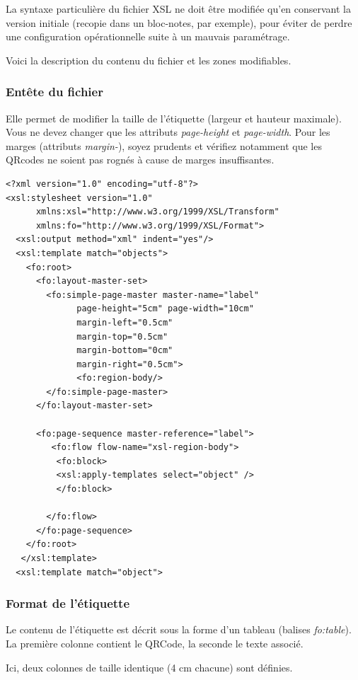 La syntaxe particulière du fichier XSL ne doit être modifiée qu'en conservant la version initiale (recopie dans un bloc-notes, par exemple), pour éviter de perdre une configuration opérationnelle suite à un mauvais paramétrage.

Voici la description du contenu du fichier et les zones modifiables.

\subsubsection{Entête du fichier}
Elle permet de modifier la taille de l'étiquette (largeur et hauteur maximale). Vous ne devez changer que les attributs \textit{page-height} et \textit{page-width}. Pour les marges (attributs \textit{margin-}), soyez prudents et vérifiez notamment que les QRcodes ne soient pas rognés à cause de marges insuffisantes.

\begin{lstlisting}
<?xml version="1.0" encoding="utf-8"?>
<xsl:stylesheet version="1.0"
      xmlns:xsl="http://www.w3.org/1999/XSL/Transform"
      xmlns:fo="http://www.w3.org/1999/XSL/Format">
  <xsl:output method="xml" indent="yes"/>
  <xsl:template match="objects">
    <fo:root>
      <fo:layout-master-set>
        <fo:simple-page-master master-name="label"
              page-height="5cm" page-width="10cm" 
              margin-left="0.5cm" 
              margin-top="0.5cm" 
              margin-bottom="0cm" 
              margin-right="0.5cm">  
              <fo:region-body/>
        </fo:simple-page-master>
      </fo:layout-master-set>
      
      <fo:page-sequence master-reference="label">
         <fo:flow flow-name="xsl-region-body">        
          <fo:block>
          <xsl:apply-templates select="object" />
          </fo:block>

        </fo:flow>
      </fo:page-sequence>
    </fo:root>
   </xsl:template>
  <xsl:template match="object">
\end{lstlisting}

\subsubsection{Format de l'étiquette}
Le contenu de l'étiquette est décrit sous la forme d'un tableau (balises \textit{fo:table}). La première colonne contient le QRCode, la seconde le texte associé.

Ici, deux colonnes de taille identique (4 cm chacune) sont définies.

